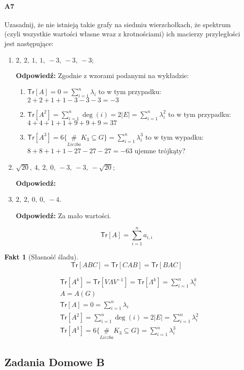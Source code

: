 \documentclass[a4paper,12pt]{article}
\theoremstyle{definition}%
\newtheorem*{fact*}{Fakt} %
\theoremstyle{definition}
\theoremstyle{problem}
\begin{document}
\paragraph{A7} Uzasadnij, że nie istnieją takie grafy na siedmiu wierzchołkach, że spektrum (czyli wszystkie wartości własne wraz z krotnościami) ich macierzy przyległości jest następujące:
\begin{enumerate}[label=\alph*)]
\item $2,\ 2,\ 1,\ 1,\ -3,\ -3,\ -3;$

\textbf{Odpowiedź: }Zgodnie z wzorami podanymi na wykładzie:
\begin{enumerate}[label=\arabic*.]
\item $\mathsf{Tr}[A]=0=\sum_{i=1}^n\lambda _i$ to w tym przypadku: $2+2+1+1-3-3-3 = -3$
\item $\mathsf{Tr}[A^2]=\sum_{i=1}^n\deg (i)=2|E|=\sum_{i=1}^n\lambda ^2_i$ to w tym przypadku: $4+4+1+1+9+9+9=37$ 
\item $\mathsf{Tr}[A^3]=6 \{\underset{Liczba}{\#} K_3 \subseteq G\}=\sum_{i=1}^n\lambda ^3_i$ to w tym wypadku: $8+8+1+1-27-27-27=-63$ ujemne trójkąty?
\end{enumerate}


\item $\sqrt{20},\ 4,\ 2,\ 0,\ -3,\ -3,\ -\sqrt{20};$

\textbf{Odpowiedź: }
\item $2,\ 2,\ 0,\ 0,\ -4$.

\textbf{Odpowiedź: }Za mało wartości.
\end{enumerate}


$$\mathsf{Tr}[A]=\sum_{i=1}^n a_{i,i}$$
\begin{fact*}[Słasność śladu]
$$\mathsf{Tr}[ABC]=\mathsf{Tr}[CAB]=\mathsf{Tr}[BAC]$$
\end{fact*}
\begin{align*}
&\mathsf{Tr}[A^k]=\mathsf{Tr}[V \Lambda V^{-1}]=\mathsf{Tr}[\Lambda ^k]=\sum_{i=1}^n\lambda_i^k\\
&A=A(G)\\
&\mathsf{Tr}[A]=0=\sum_{i=1}^n\lambda _i\\
&\mathsf{Tr}[A^2]=\sum_{i=1}^n\deg (i)=2|E|=\sum_{i=1}^n\lambda ^2_i\\
&\mathsf{Tr}[A^3]=6 \{\underset{Liczba}{\#} K_3 \subseteq G\}=\sum_{i=1}^n\lambda ^3_i
\end{align*}

\subsection{Zadania Domowe B}
\end{document}
